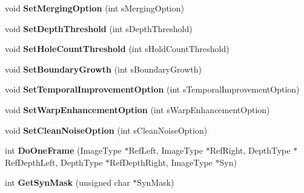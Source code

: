 \begin{DoxyCompactItemize}
void {\bfseries Set\+Merging\+Option} (int s\+Merging\+Option)
\item 
\mbox{\label{class_c_view_interpolation1_d_ab24ceb6a41bdab3c6c5638850f511320}} 
void {\bfseries Set\+Depth\+Threshold} (int s\+Depth\+Threshold)
\item 
\mbox{\label{class_c_view_interpolation1_d_a4ea96bdfce7e69fc70cbc682a02ce888}} 
void {\bfseries Set\+Hole\+Count\+Threshold} (int s\+Hold\+Count\+Threshold)
\item 
\mbox{\label{class_c_view_interpolation1_d_abff3b741d27b54cdf7fbf91170f7bb20}} 
void {\bfseries Set\+Boundary\+Growth} (int s\+Boundary\+Growth)
\item 
\mbox{\label{class_c_view_interpolation1_d_aebe51641eff35b150d24d797a0ed0d6d}} 
void {\bfseries Set\+Temporal\+Improvement\+Option} (int s\+Temporal\+Improvement\+Option)
\item 
\mbox{\label{class_c_view_interpolation1_d_a250180f84745a369fe30de73bb2baf8b}} 
void {\bfseries Set\+Warp\+Enhancement\+Option} (int s\+Warp\+Enhancement\+Option)
\item 
\mbox{\label{class_c_view_interpolation1_d_a87b7796cf13000efdb52722bf1b1e8b4}} 
void {\bfseries Set\+Clean\+Noise\+Option} (int s\+Clean\+Noise\+Option)
\item 
\mbox{\label{class_c_view_interpolation1_d_af23f9401c84fbe97ebf38c9a2fed6a39}} 
int {\bfseries Do\+One\+Frame} (Image\+Type $\ast$Ref\+Left, Image\+Type $\ast$Ref\+Right, Depth\+Type $\ast$Ref\+Depth\+Left, Depth\+Type $\ast$Ref\+Depth\+Right, Image\+Type $\ast$Syn)
\item 
\mbox{\label{class_c_view_interpolation1_d_ad28637146fa4c320d1e7e4723b9a1325}} 
int {\bfseries Get\+Syn\+Mask} (unsigned char $\ast$Syn\+Mask)
\item 
\mbox{\label{class_c_view_interpolation1_d_a42e30a97ade4272e56bfab5ca693d8f6}} 

\end{DoxyCompactItemize}
